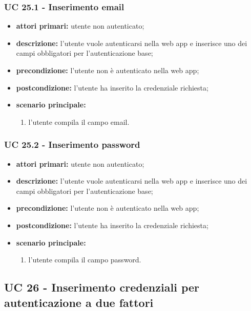 		\subsubsection{UC 25.1 - Inserimento email}
		\begin{itemize}
			\item \textbf{attori primari:} utente non autenticato;
			\item \textbf{descrizione:} l'utente vuole autenticarsi nella web app e inserisce uno dei campi obbligatori per l'autenticazione base;
			\item \textbf{precondizione:} l'utente non è autenticato nella web app;
			\item \textbf{postcondizione:} l'utente ha inserito la credenziale richiesta;
			\item \textbf{scenario principale:}
			\begin{enumerate}
				\item l'utente compila il campo email.
			\end{enumerate}
		\end{itemize}
		
		\subsubsection{UC 25.2 - Inserimento password}
		\begin{itemize}
			\item \textbf{attori primari:} utente non autenticato;
			\item \textbf{descrizione:} l'utente vuole autenticarsi nella web app e inserisce uno dei campi obbligatori per l'autenticazione base;
			\item \textbf{precondizione:} l'utente non è autenticato nella web app;
			\item \textbf{postcondizione:} l'utente ha inserito la credenziale richiesta;
			\item \textbf{scenario principale:}
			\begin{enumerate}
				\item l'utente compila il campo password.
			\end{enumerate}
		\end{itemize}
		
		\subsection{UC 26 - Inserimento credenziali per autenticazione a due fattori}
		
